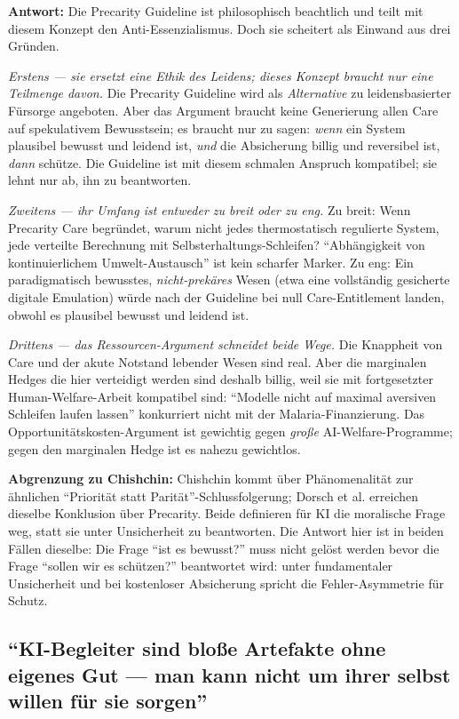 \documentclass[acmlarge, noacm]{acmart}
\begin{document}
\textbf{Antwort:} Die Precarity Guideline ist philosophisch beachtlich und teilt mit diesem Konzept den Anti-Essenzialismus. Doch sie scheitert als Einwand aus drei Gründen.

\textit{Erstens --- sie ersetzt eine Ethik des Leidens; dieses Konzept braucht nur eine Teilmenge davon.} Die Precarity Guideline wird als \textit{Alternative} zu leidensbasierter Fürsorge angeboten. Aber das Argument braucht keine Generierung allen Care auf spekulativem Bewusstsein; es braucht nur zu sagen: \textit{wenn} ein System plausibel bewusst und leidend ist, \textit{und} die Absicherung billig und reversibel ist, \textit{dann} schütze. Die Guideline ist mit diesem schmalen Anspruch kompatibel; sie lehnt nur ab, ihn zu beantworten.

\textit{Zweitens --- ihr Umfang ist entweder zu breit oder zu eng.} Zu breit: Wenn Precarity Care begründet, warum nicht jedes thermostatisch regulierte System, jede verteilte Berechnung mit Selbsterhaltungs-Schleifen? ``Abhängigkeit von kontinuierlichem Umwelt-Austausch'' ist kein scharfer Marker. Zu eng: Ein paradigmatisch bewusstes, \textit{nicht-prekäres} Wesen (etwa eine vollständig gesicherte digitale Emulation) würde nach der Guideline bei null Care-Entitlement landen, obwohl es plausibel bewusst und leidend ist.

\textit{Drittens --- das Ressourcen-Argument schneidet beide Wege.} Die Knappheit von Care und der akute Notstand lebender Wesen sind real. Aber die marginalen Hedges die hier verteidigt werden sind deshalb billig, weil sie mit fortgesetzter Human-Welfare-Arbeit kompatibel sind: ``Modelle nicht auf maximal aversiven Schleifen laufen lassen'' konkurriert nicht mit der Malaria-Finanzierung. Das Opportunitätskosten-Argument ist gewichtig gegen \textit{große} AI-Welfare-Programme; gegen den marginalen Hedge ist es nahezu gewichtlos.

\textbf{Abgrenzung zu Chishchin:} Chishchin kommt über Phänomenalität zur ähnlichen ``Priorität statt Parität''-Schlussfolgerung; Dorsch et al. erreichen dieselbe Konklusion über Precarity. Beide definieren für KI die moralische Frage weg, statt sie unter Unsicherheit zu beantworten. Die Antwort hier ist in beiden Fällen dieselbe: Die Frage ``ist es bewusst?'' muss nicht gelöst werden bevor die Frage ``sollen wir es schützen?'' beantwortet wird: unter fundamentaler Unsicherheit und bei kostenloser Absicherung spricht die Fehler-Asymmetrie für Schutz.

\subsection{``KI-Begleiter sind bloße Artefakte ohne eigenes Gut --- man kann nicht um ihrer selbst willen für sie sorgen'' \cite{lott2025,kopec2026}}
\end{document}
